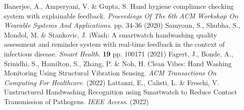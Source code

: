 \begin{thebibliography}{99}
    Banerjee, A., Amperyani, V. \& Gupta, S. Hand hygiene compliance checking system with explainable feedback. {\em Proceedings Of The 6th ACM Workshop On Wearable Systems And Applications}. pp. 34-36 (2020)
    Samyoun, S., Shubha, S., Mondol, M. \& Stankovic, J. iWash: A smartwatch handwashing quality assessment and reminder system with real-time feedback in the context of infectious disease. {\em Smart Health}. \textbf{19} pp. 100171 (2021)
    Fagert, J., Bonde, A., Srinidhi, S., Hamilton, S., Zhang, P. \& Noh, H. Clean Vibes: Hand Washing Monitoring Using Structural Vibration Sensing. {\em ACM Transactions On Computing For Healthcare}. (2022)
    Lattanzi, E., Calisti, L. \& Freschi, V. Unstructured Handwashing Recognition using Smartwatch to Reduce Contact Transmission of Pathogens. {\em IEEE Access}. (2022)
\end{thebibliography}